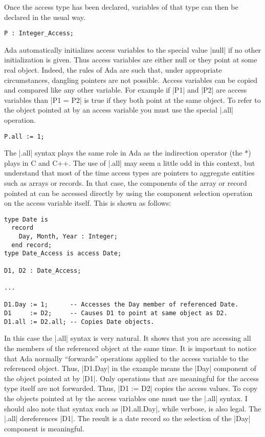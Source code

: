 Once the access type has been declared, variables of that type can then be declared in the usual
way.

\begin{lstlisting}
P : Integer_Access;
\end{lstlisting}

Ada automatically initializes access variables to the special value |null| if no other
initialization is given. Thus access variables are either null or they point at some real
object. Indeed, the rules of Ada are such that, under appropriate circumstances, dangling
pointers are not possible. Access variables can be copied and compared like any other variable.
For example if |P1| and |P2| are access variables than |P1 = P2| is true if they both point at
the same object. To refer to the object pointed at by an access variable you must use the
special |.all| operation.

\begin{lstlisting}
P.all := 1;
\end{lstlisting}

The |.all| syntax plays the same role in Ada as the indirection operator (the *) plays in C and
C++. The use of |.all| may seem a little odd in this context, but understand that most of the
time access types are pointers to aggregate entities such as arrays or records. In that case,
the components of the array or record pointed at can be accessed directly by using the component
selection operation on the access variable itself. This is shown as follows:

\begin{lstlisting}
type Date is
  record
    Day, Month, Year : Integer;
  end record;
type Date_Access is access Date;

D1, D2 : Date_Access;

...

D1.Day := 1;      -- Accesses the Day member of referenced Date.
D1     := D2;     -- Causes D1 to point at same object as D2.
D1.all := D2.all; -- Copies Date objects.
\end{lstlisting}

In this case the |.all| syntax is very natural. It shows that you are accessing all the members
of the referenced object at the same time. It is important to notice that Ada normally
``forwards'' operations applied to the access variable to the referenced object. Thus, |D1.Day|
in the example means the |Day| component of the object pointed at by |D1|. Only operations that
are meaningful for the access type itself are not forwarded. Thus, |D1 := D2| copies the access
values. To copy the objects pointed at by the access variables one must use the |.all| syntax. I
should also note that syntax such as |D1.all.Day|, while verbose, is also legal. The |.all|
dereferences |D1|. The result is a date record so the selection of the |Day| component is
meaningful.

